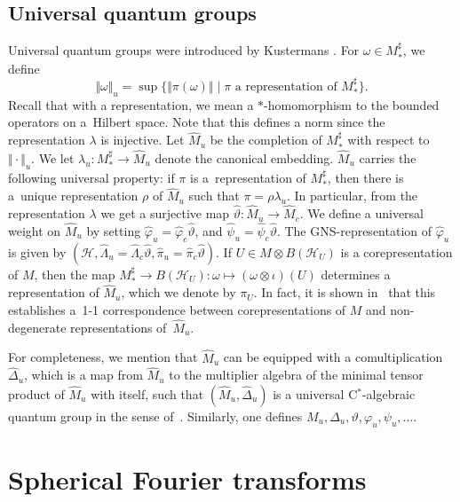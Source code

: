 \documentclass[pdftex]{sigma}
\numberwithin{equation}{section}
\theoremstyle{definition}
\newcommand{\cHil}{\mathcal{H}}
\begin{document}
\subsection*{Universal quantum groups}
Universal quantum groups were introduced by Kustermans \cite{Kus}.
 For $\omega \in M_\ast^\sharp$, we def\/ine
\[
    \Vert \omega \Vert_u = \sup \{ \Vert \pi(\omega) \Vert \mid \pi \textrm{ a }   \textrm{representation of } M_\ast^\sharp   \}.
\]
Recall that with a representation, we mean a $\ast$-homomorphism to the bounded operators on a~Hilbert space.
Note that this def\/ines a norm since the representation $\lambda$ is injective.
 Let $\hat{M}_u$ be the completion of $M_\ast^\sharp$ with respect to $\Vert \cdot \Vert_u$. We let $\lambda_u: M_\ast^\sharp \rightarrow \hat{M}_u$ denote the canonical embedding. $\hat{M}_u$ carries the following universal property: if $\pi$ is a~representation of $M_\ast^\sharp$, then there is a~unique representation $\rho$ of $\hat{M}_u$ such that $\pi = \rho \lambda_u$. In particular, from the representation $\lambda$ we get a surjective map $\hat{\vartheta}: \hat{M}_u \rightarrow \hat{M}_c$. We def\/ine a universal weight on $\hat{M}_u$ by setting $\hat{\varphi}_u = \hat{\varphi}_c \hat{\vartheta}$, and $\hat{\psi}_u = \hat{\psi}_c \hat{\vartheta}$. The GNS-representation of $\hat{\varphi}_u$ is given by $(\cHil, \hat{\Lambda}_u = \hat{\Lambda}_c \hat{\vartheta}, \hat{\pi}_u = \hat{\pi}_c \hat{\vartheta})$. If $U \in M \otimes B(\cHil_U)$ is a corepresentation of $M$, then the map $M_\ast^\sharp \rightarrow B(\cHil_U): \omega \mapsto (\omega \otimes \iota)(U)$ determines a representation of $\hat{M}_u$, which we denote by $\pi_U$. In fact, it is shown in~\cite{Kus} that this establishes a~1-1 correspondence between corepresentations of $M$ and non-degenerate representations of~$\hat{M}_u$.

For completeness, we mention that $\hat{M}_u$ can be equipped with a comultiplication $\hat{\Delta}_u$, which is a map from $\hat{M}_u$ to the multiplier algebra of the minimal tensor product of $\hat{M}_u$ with itself, such that $(\hat{M}_u, \hat{\Delta}_u)$ is a universal C$^\ast$-algebraic quantum group in the sense of~\cite{Kus}.
Similarly, one def\/ines $M_u, \Delta_u, \vartheta, \varphi_u, \psi_u, \ldots$.


\section{Spherical Fourier transforms}\label{SectHomogeneousSpaces}
\end{document}
